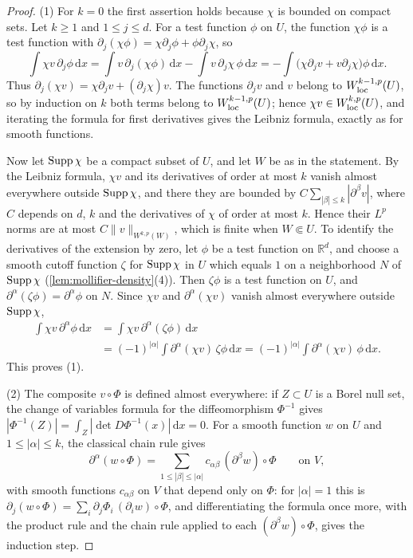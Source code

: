 \begin{proof}
(1) For $k=0$ the first assertion holds because $\chi$ is bounded on compact sets. Let $k\geq1$ and $1\leq j\leq d$. For a test function $\phi$ on $U$, the function $\chi\phi$ is a test function with $\partial_j(\chi\phi)=\chi\partial_j\phi+\phi\partial_j\chi$, so
\[
 \int\chi v\,\partial_j\phi\,\mathrm d x=\int v\,\partial_j(\chi\phi)\,\mathrm d x-\int v\,\partial_j\chi\,\phi\,\mathrm d x=-\int\bigl(\chi\partial_jv+v\partial_j\chi\bigr)\phi\,\mathrm d x.
\]
Thus $\partial_j(\chi v)=\chi\partial_jv+(\partial_j\chi)v$. The functions $\partial_jv$ and $v$ belong to $W^{k-1,p}_{\mathrm{loc}}(U)$, so by induction on $k$ both terms belong to $W^{k-1,p}_{\mathrm{loc}}(U)$; hence $\chi v\in W^{k,p}_{\mathrm{loc}}(U)$, and iterating the formula for first derivatives gives the Leibniz formula, exactly as for smooth functions.

Now let $\operatorname{Supp}\chi$ be a compact subset of $U$, and let $W$ be as in the statement. By the Leibniz formula, $\chi v$ and its derivatives of order at most $k$ vanish almost everywhere outside $\operatorname{Supp}\chi$, and there they are bounded by $C\sum_{|\beta|\leq k}|\partial^\beta v|$, where $C$ depends on $d$, $k$ and the derivatives of $\chi$ of order at most $k$. Hence their $L^p$ norms are at most $C\|v\|_{W^{k,p}(W)}$, which is finite when $W\Subset U$. To identify the derivatives of the extension by zero, let $\phi$ be a test function on $\mathbb R^d$, and choose a smooth cutoff function $\zeta$ for $\operatorname{Supp}\chi$ in $U$ which equals $1$ on a neighborhood $N$ of $\operatorname{Supp}\chi$ (\cref{lem:mollifier-density}(4)). Then $\zeta\phi$ is a test function on $U$, and $\partial^\alpha(\zeta\phi)=\partial^\alpha\phi$ on $N$. Since $\chi v$ and $\partial^\alpha(\chi v)$ vanish almost everywhere outside $\operatorname{Supp}\chi$,
\[
\begin{split}
 \int\chi v\,\partial^\alpha\phi\,\mathrm d x&=\int\chi v\,\partial^\alpha(\zeta\phi)\,\mathrm d x\\
 &=(-1)^{|\alpha|}\int\partial^\alpha(\chi v)\,\zeta\phi\,\mathrm d x=(-1)^{|\alpha|}\int\partial^\alpha(\chi v)\,\phi\,\mathrm d x.
\end{split}
\]
This proves (1).

(2) The composite $v\circ\Phi$ is defined almost everywhere: if $Z\subset U$ is a Borel null set, the change of variables formula for the diffeomorphism $\Phi^{-1}$ gives $|\Phi^{-1}(Z)|=\int_Z|\det D\Phi^{-1}(x)|\,\mathrm d x=0$. For a smooth function $w$ on $U$ and $1\leq|\alpha|\leq k$, the classical chain rule gives
\[
 \partial^\alpha(w\circ\Phi)=\sum_{1\leq|\beta|\leq|\alpha|}c_{\alpha\beta}\,(\partial^\beta w)\circ\Phi\qquad\text{on }V,
\]
with smooth functions $c_{\alpha\beta}$ on $V$ that depend only on $\Phi$: for $|\alpha|=1$ this is $\partial_j(w\circ\Phi)=\sum_i\partial_j\Phi_i\,(\partial_iw)\circ\Phi$, and differentiating the formula once more, with the product rule and the chain rule applied to each $(\partial^\beta w)\circ\Phi$, gives the induction step.


\end{proof}
